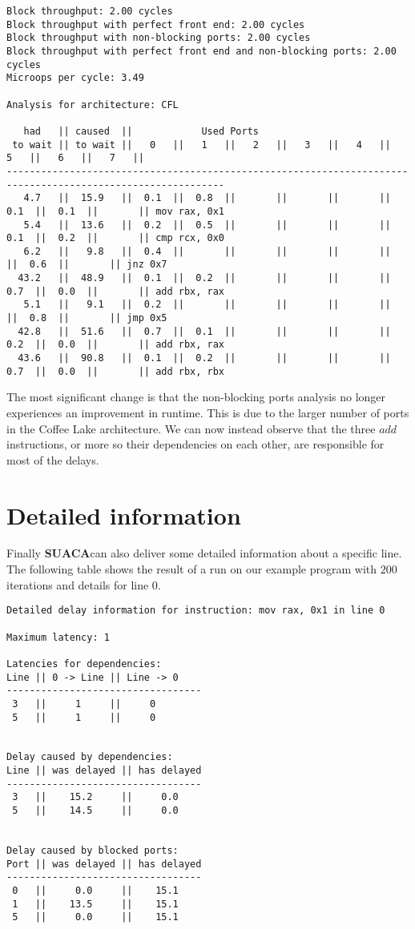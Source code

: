 \documentclass[a4paper,12pt,titlepage, twoside]{report}
\newcommand{\suaca}{\textbf{SUACA}}
\begin{document}
\begin{Verbatim}[fontsize=\scriptsize]
Block throughput: 2.00 cycles
Block throughput with perfect front end: 2.00 cycles
Block throughput with non-blocking ports: 2.00 cycles
Block throughput with perfect front end and non-blocking ports: 2.00 cycles
Microops per cycle: 3.49

Analysis for architecture: CFL

   had   || caused  ||            Used Ports
 to wait || to wait ||   0   ||   1   ||   2   ||   3   ||   4   ||   5   ||   6   ||   7   ||
------------------------------------------------------------------------------------------------------------
   4.7   ||  15.9   ||  0.1  ||  0.8  ||       ||       ||       ||  0.1  ||  0.1  ||       || mov rax, 0x1
   5.4   ||  13.6   ||  0.2  ||  0.5  ||       ||       ||       ||  0.1  ||  0.2  ||       || cmp rcx, 0x0
   6.2   ||   9.8   ||  0.4  ||       ||       ||       ||       ||       ||  0.6  ||       || jnz 0x7
  43.2   ||  48.9   ||  0.1  ||  0.2  ||       ||       ||       ||  0.7  ||  0.0  ||       || add rbx, rax
   5.1   ||   9.1   ||  0.2  ||       ||       ||       ||       ||       ||  0.8  ||       || jmp 0x5
  42.8   ||  51.6   ||  0.7  ||  0.1  ||       ||       ||       ||  0.2  ||  0.0  ||       || add rbx, rax
  43.6   ||  90.8   ||  0.1  ||  0.2  ||       ||       ||       ||  0.7  ||  0.0  ||       || add rbx, rbx
\end{Verbatim}

The most significant change is that the non-blocking ports analysis no longer experiences an improvement in runtime. This is due to the larger number of ports in the Coffee Lake architecture. We can now instead observe that the three $add$ instructions, or more so their dependencies on each other, are responsible for most of the delays. 




\section{Detailed information}
Finally \suaca can also deliver some detailed information about a specific line. The following table shows the result of a run on our example program with $200$ iterations and details for line $0$.

\begin{Verbatim}[fontsize=\scriptsize]
Detailed delay information for instruction: mov rax, 0x1 in line 0

Maximum latency: 1

Latencies for dependencies:
Line || 0 -> Line || Line -> 0
----------------------------------
 3   ||     1     ||     0
 5   ||     1     ||     0


Delay caused by dependencies:
Line || was delayed || has delayed
----------------------------------
 3   ||    15.2     ||     0.0
 5   ||    14.5     ||     0.0


Delay caused by blocked ports:
Port || was delayed || has delayed
----------------------------------
 0   ||     0.0     ||    15.1
 1   ||    13.5     ||    15.1
 5   ||     0.0     ||    15.1
\end{Verbatim}
\end{document}
